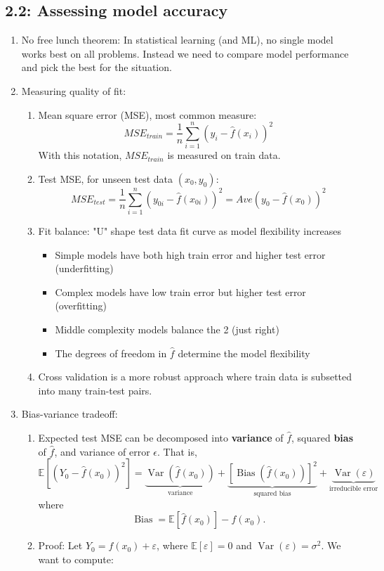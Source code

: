 \documentclass{article}
\begin{document}
\subsection*{2.2: Assessing model accuracy}

\begin{enumerate}
\item No free lunch theorem: In statistical learning (and ML), no single model works best on all problems. Instead we need to compare model performance and pick the best for the situation.

\item Measuring quality of fit: 
\begin{enumerate}
\item Mean square error (MSE), most common measure:
\[
MSE_{train} = \frac{1}{n} \sum_{i=1}^n (y_i - \hat{f}(x_i))^2
\]
With this notation, $MSE_{train}$ is measured on train data.
\item Test MSE, for unseen test data $(x_0, y_0)$:
\[
MSE_{test} = \frac{1}{n} \sum_{i=1}^n (y_{0i} - \hat{f}(x_{0i}))^2 = Ave(y_0 - \hat{f}(x_0))^2
\]
\item Fit balance: "U" shape test data fit curve as model flexibility increases
\begin{itemize}
\item Simple models have both high train error and higher test error (underfitting)
\item Complex models have low train error but higher test error (overfitting)
\item Middle complexity models balance the 2 (just right)
\item The degrees of freedom in $\hat{f}$ determine the model flexibility
\end{itemize}
\item Cross validation is a more robust approach where train data is subsetted into many train-test pairs.
\end{enumerate}

\item Bias-variance tradeoff:
\begin{enumerate}
\item Expected test MSE can be decomposed into \textbf{variance} of $\hat{f}$, squared \textbf{bias} of $\hat{f}$, and variance of error $\epsilon$. That is,
\[
\mathbb{E}\left[(Y_0 - \hat{f}(x_0))^2\right] = 
\underbrace{\operatorname{Var}(\hat{f}(x_0))}_{\text{variance}} + 
\underbrace{\left[\operatorname{Bias}(\hat{f}(x_0))\right]^2}_{\text{squared bias}} + 
\underbrace{\operatorname{Var}(\varepsilon)}_{\text{irreducible error}}
\]
where
\[
\operatorname{Bias} = \mathbb{E}\left[ \hat{f}(x_0) \right] - f(x_0).
\]
\item Proof: Let \( Y_0 = f(x_0) + \varepsilon \), where \( \mathbb{E}[\varepsilon] = 0 \) and \( \operatorname{Var}(\varepsilon) = \sigma^2 \). We want to compute:


\end{enumerate}
\end{enumerate}
\end{document}

